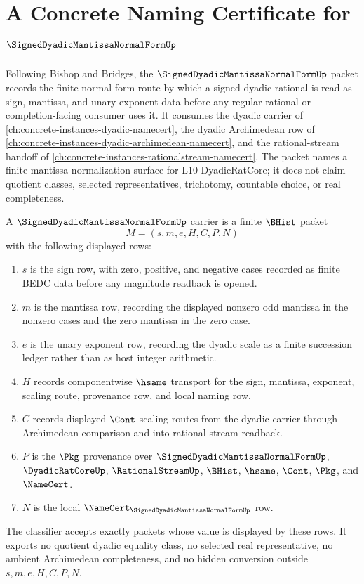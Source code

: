 \chapter{A Concrete Naming Certificate for $\SignedDyadicMantissaNormalFormUp$}
\label{ch:concrete-instances-signed-dyadic-mantissa-normal-form-namecert}

Following Bishop and Bridges, the $\SignedDyadicMantissaNormalFormUp$ packet records the finite normal-form route by which a signed dyadic rational is read as sign, mantissa, and unary exponent data before any regular rational or completion-facing consumer uses it. It consumes the dyadic carrier of \autoref{ch:concrete-instances-dyadic-namecert}, the dyadic Archimedean row of \autoref{ch:concrete-instances-dyadic-archimedean-namecert}, and the rational-stream handoff of \autoref{ch:concrete-instances-rationalstream-namecert}. The packet names a finite mantissa normalization surface for L10 DyadicRatCore; it does not claim quotient classes, selected representatives, trichotomy, countable choice, or real completeness.

\begin{definition}
\label{def:signed-dyadic-mantissa-normal-form-carrier}
A $\SignedDyadicMantissaNormalFormUp$ carrier is a finite $\BHist$ packet
$$
M=(s,m,e,H,C,P,N)
$$
with the following displayed rows:
\begin{enumerate}
\item $s$ is the sign row, with zero, positive, and negative cases recorded as finite BEDC data before any magnitude readback is opened.
\item $m$ is the mantissa row, recording the displayed nonzero odd mantissa in the nonzero cases and the zero mantissa in the zero case.
\item $e$ is the unary exponent row, recording the dyadic scale as a finite succession ledger rather than as host integer arithmetic.
\item $H$ records componentwise $\hsame$ transport for the sign, mantissa, exponent, scaling route, provenance row, and local naming row.
\item $C$ records displayed $\Cont$ scaling routes from the dyadic carrier through Archimedean comparison and into rational-stream readback.
\item $P$ is the $\Pkg$ provenance over $\SignedDyadicMantissaNormalFormUp$, $\DyadicRatCoreUp$, $\RationalStreamUp$, $\BHist$, $\hsame$, $\Cont$, $\Pkg$, and $\NameCert$.
\item $N$ is the local $\NameCert_{\SignedDyadicMantissaNormalFormUp}$ row.
\end{enumerate}
The classifier accepts exactly packets whose value is displayed by these rows. It exports no quotient dyadic equality class, no selected real representative, no ambient Archimedean completeness, and no hidden conversion outside $s,m,e,H,C,P,N$.
\end{definition}

